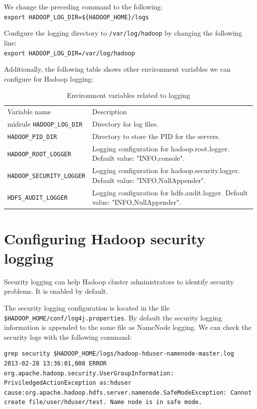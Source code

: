 We change the preceding command to the following: \\
\verb|export HADOOP_LOG_DIR=${HADOOP_HOME}/logs|

Configure the logging directory to \verb|/var/log/hadoop| by changing the following line: \\
\verb|export HADOOP_LOG_DIR=/var/log/hadoop|

Additionally, the following table shows other environment variables we can configure for Hadoop logging:

\begin{table}\scriptsize
  \begin{tabular}{ll}
    \toprule 
    Variable name & Description \\ midrule
    \verb|HADOOP_LOG_DIR| & Directory for log files. \\ 
    \verb|HADOOP_PID_DIR| & Directory to store the PID for the servers. \\
    \verb|HADOOP_ROOT_LOGGER| & Logging configuration for hadoop.root.logger. Default value: "INFO,console". \\
    \verb|HADOOP_SECURITY_LOGGER| & Logging configuration for hadoop.security.logger. Default value: "INFO,NullAppender".\\
    \verb|HDFS_AUDIT_LOGGER| & Logging configuration for hdfs.audit.logger. Default value: "INFO,NullAppender".\\ \bottomrule 
  \end{tabular}
  \caption{Environment variables related to logging}\label{tbl:loggingenv}
\end{table}

\section{Configuring Hadoop security logging}
Security logging can help Hadoop cluster administrators to identify security problems. It is enabled by default.

The security logging configuration is located in the file \verb|$HADOOP_HOME/conf/log4j.properties|. By default the security logging information is appended to the same file as NameNode logging. We can check the security logs with the following command:
\begin{verbatim}
grep security $HADOOP_HOME/logs/hadoop-hduser-namenode-master.log
2013-02-28 13:36:01,008 ERROR org.apache.hadoop.security.UserGroupInformation: PriviledgedActionException as:hduser cause:org.apache.hadoop.hdfs.server.namenode.SafeModeException: Cannot create file/user/hduser/test. Name node is in safe mode.
\end{verbatim}

